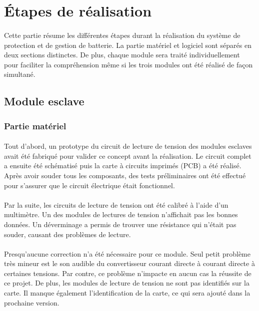 \section{Étapes de réalisation}

	\paragraph{}
	Cette partie résume les différentes étapes durant la réalisation du système de protection et de gestion de batterie. La partie matériel et logiciel sont séparés en deux sections distinctes. De plus, chaque module sera traité individuellement pour faciliter la compréhension même si les trois modules ont été réalisé de façon simultané. 

	\subsection{Module esclave}
	
		\subsubsection{Partie matériel}	
		
			\paragraph{}
			Tout d’abord, un prototype du circuit de lecture de tension des modules esclaves avait été fabriqué pour valider ce concept avant la réalisation. Le circuit complet a ensuite été schématisé puis la carte à circuits imprimés (PCB) a été réalisé. Après avoir souder tous les composants, des tests préliminaires ont été effectué pour s’assurer que le circuit électrique était fonctionnel.
			
			\paragraph{}			
			Par la suite, les circuits de lecture de tension ont été calibré à l’aide d’un multimètre. Un des modules de lectures de tension n’affichait pas les bonnes données. Un déverminage a permis de trouver une résistance qui n’était pas souder, causant des problèmes de lecture. 
			
			\paragraph{}			
			Presqu’aucune correction n’a été nécessaire pour ce module. Seul petit problème très mineur est le son audible du convertisseur courant directe à courant directe à certaines tensions. Par contre, ce problème n’impacte en aucun cas la réussite de ce projet. De plus, les modules de lecture de tension ne sont pas identifiés sur la carte. Il manque également l’identification de la carte, ce qui sera ajouté dans la prochaine version.

